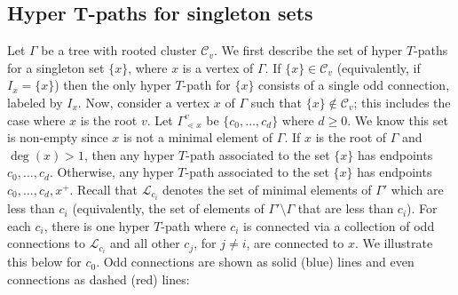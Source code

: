 \documentclass[pdftex]{sigma}
\numberwithin{equation}{section}
\begin{document}
\subsection[Hyper T-paths for singleton sets]{Hyper $\boldsymbol{T}$-paths for singleton sets}\label{sec:single-sets}
Let $\Gamma$ be a tree with rooted cluster $\mathcal{C}_{v}$. We first describe the set of hyper $T$-paths for a singleton set $\{x\}$, where $x$ is a vertex of $\Gamma$.
If $\{x\} \in \mathcal{C}_v$ (equivalently, if $I_{x} = \{x\}$) then the only hyper $T$-path for $\{x\}$ consists of a single odd connection, labeled by $I_{x}$. Now, consider a vertex $x$ of $\Gamma$ such that $\{x\} \notin \mathcal{C}_v$; this includes the case where $x$ is the root $v$.
Let $\Gamma_{\lessdot x}^v$ be $\{c_0,\ldots,c_d\}$ where $d \geq 0$. We know this set is non-empty since $x$ is not a minimal element of $\Gamma$. If $x$ is the root of $\Gamma$ and $\deg(x) > 1$, then any hyper $T$-path associated to the set $\{x\}$ has endpoints $c_0,\ldots,c_d$. Otherwise, any hyper $T$-path associated to the set $\{x\}$ has endpoints $c_0,\ldots,c_d,x^+$.
Recall that $\mathcal{L}_{c_i}$ denotes the set of minimal elements of $\Gamma'$ which are less than $c_i$ (equivalently, the set of elements of $\Gamma' \setminus \Gamma$ that are less than $c_i$). For each $c_i$, there is one hyper $T$-path where $c_i$ is connected via a collection of odd connections to $\mathcal{L}_{c_i}$ and all other $c_j$, for $j \neq i$, are connected to $x$. We illustrate this below for $c_0$. Odd connections are shown as solid (blue) lines and even connections as dashed (red) lines:
\end{document}
